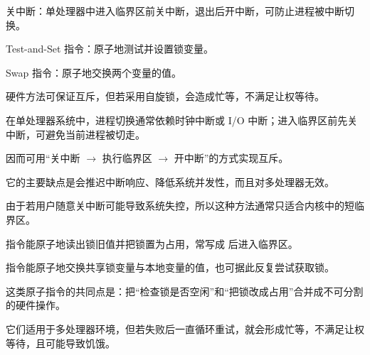 \begin{points}
  \item 关中断：单处理器中进入临界区前关中断，退出后开中断，可防止进程被中断切换。
  \item Test-and-Set 指令：原子地测试并设置锁变量。
  \item Swap 指令：原子地交换两个变量的值。
  \item 硬件方法可保证互斥，但若采用自旋锁，会造成忙等，不满足让权等待。
\end{points}

\begin{points}
  \item 在单处理器系统中，进程切换通常依赖时钟中断或 I/O 中断；进入临界区前先关中断，可避免当前进程被切走。
  \item 因而可用“关中断 $\rightarrow$ 执行临界区 $\rightarrow$ 开中断”的方式实现互斥。
  \item 它的主要缺点是会推迟中断响应、降低系统并发性，而且对多处理器无效。
  \item 由于若用户随意关中断可能导致系统失控，所以这种方法通常只适合内核中的短临界区。
\end{points}

\begin{points}
  \item {} 指令能原子地读出锁旧值并把锁置为占用，常写成  后进入临界区。
  \item {} 指令能原子地交换共享锁变量与本地变量的值，也可据此反复尝试获取锁。
  \item 这类原子指令的共同点是：把“检查锁是否空闲”和“把锁改成占用”合并成不可分割的硬件操作。
  \item 它们适用于多处理器环境，但若失败后一直循环重试，就会形成忙等，不满足让权等待，且可能导致饥饿。
\end{points}


